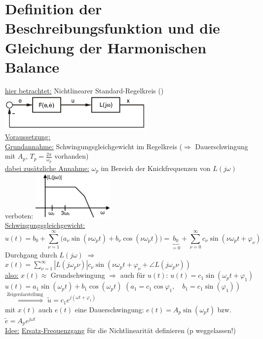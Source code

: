 \documentclass[openany,a4paper,11pt]{book}
\begin{document}
\section[Grundlagen]{Definition der Beschreibungsfunktion und die Gleichung der Harmonischen Balance}
\uline{hier betrachtet:} Nichtlinearer Standard-Regelkreis ()\\
\includegraphics[width=3in]{imgs/NLR45.png}\\
\uline{Voraussetzung:} \\
\uline{Grundannahme:} Schwingungsgleichgewicht im Regelkreis ($\Rightarrow$ Dauerschwingung mit $A_p$, $T_p=\frac{2\pi}{\omega_p}$ vorhanden)\\
\uline{dabei zusätzliche Annahme:} $\omega_p$ im Bereich der Knickfrequenzen von $L(j\omega)$\\
verboten: \includegraphics[width=1.6in]{imgs/NLR46.png}\\
\uline{Schwingungsgleichgewicht:} \\
\[u(t)=b_0+\sum_{\nu=1}^{\infty}\big(a_{\nu}\sin{(\nu\omega_pt)}+b_{\nu}\cos{(\nu\omega_pt)}\big)=\underbrace{b_0}_{=0}+\sum_{\nu=0}^{\infty}c_{\nu}\sin{(\nu\omega_pt+\varphi_{\nu})}\]
Durchgang durch $L(j\omega)$ $\Rightarrow$ $x(t)=\sum_{\nu=1}^{\infty}|L(j\omega_p\nu)|c_{\nu}\sin{(\nu\omega_pt+\varphi_{\nu}+\angle\!L(j\omega_p\nu))}$\\
\uline{also:} $x(t)\approx$ Grundschwingung $\Rightarrow$ auch für $u(t)$: $u(t)=c_1\sin{(\omega_pt+\varphi_1)}$\\
$u(t)=a_1\sin{(\omega_pt)}+b_1\cos{(\omega_pt)}$ $(a_1=c_1\cos{\varphi_1},\quad b_1=c_1\sin{(\varphi_1)})$\\
$\stackrel{\text{Zeigerdarstellung}}{\Rightarrow}$ $\tilde{u}=c_1e^{j(\omega t+\varphi_1)}$\\
mit $x(t)$ auch $e(t)$ eine Dauerschwingung: $e(t)=A_p\sin{(\omega_pt)}$ bzw. $\tilde{e}=A_pe^{j\omega t}$\\
\uline{Idee:} \uline{Ersatz-Frequenzgang} für die Nichtlinearität definieren (p weggelassen!)\\
\end{document}
